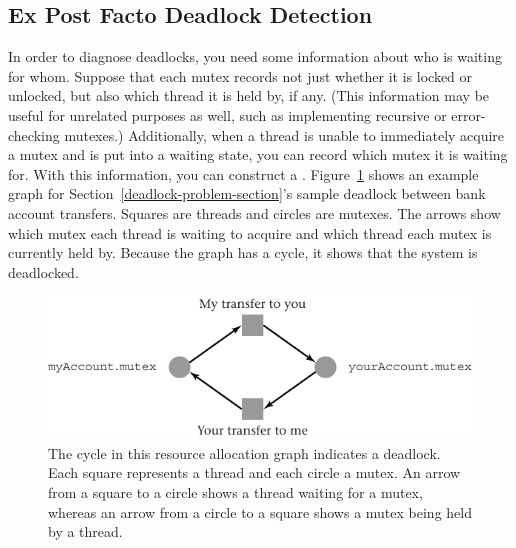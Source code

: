 \subsection{Ex Post Facto Deadlock Detection}\label{post-facto-dd-section}
In order to diagnose deadlocks, you need some information about who is
waiting for whom.  Suppose that each mutex records not just whether it
is locked or unlocked, but also which thread it is held by, if any.
(This information may be useful for unrelated purposes as well, such
as implementing recursive or error-checking mutexes.)  Additionally,
when a thread is unable to immediately acquire a mutex and is put
into a waiting state, you can record which mutex it is waiting for.
With this information, you can construct a .
Figure~\ref{resource-allocation-graph} shows an example graph for
Section~\ref{deadlock-problem-section}'s sample deadlock between bank account transfers.
Squares are threads and circles are mutexes.  The arrows show which
mutex each thread is waiting to acquire and which thread each mutex
is currently held by.
Because the graph has a cycle, it shows that the system is deadlocked.
\begin{figure}
\centerline{\includegraphics{hail_f0422}}

\caption{The cycle in this resource allocation graph indicates a
  deadlock.  Each square represents a thread and each circle a mutex.
  An arrow from a square to a circle shows a thread waiting for a
  mutex, whereas an arrow from a circle to a square shows a mutex
  being held by a thread.}
\label{resource-allocation-graph}
\end{figure}

